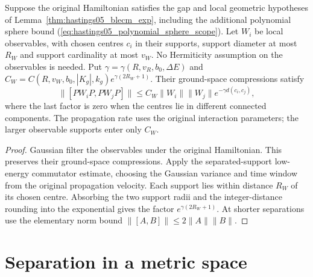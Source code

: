 \begin{lemma}
    \label{thm:hastings05_observable_commutator_decay}
    \leanok
    Suppose the original Hamiltonian satisfies the gap and local geometric
    hypotheses of Lemma~\ref{thm:hastings05_blecm_exp}, including the
    additional polynomial sphere bound
    (\ref{eq:hastings05_polynomial_sphere_scope}). Let $W_i$ be local
    observables, with chosen centres $c_i$ in their supports, support diameter
    at most $R_W$ and support cardinality at most $v_W$. No Hermiticity
    assumption on the observables is needed. Put
    $\gamma=\gamma(R,v_R,b_0,\Delta E)$ and
    $C_W=C(R,v_W,b_0,|K_g|,k_g)e^{\gamma(2R_W+1)}$.
    Their ground-space compressions satisfy
    \[
        \|[PW_iP,PW_jP]\|
        \le C_W\|W_i\|\|W_j\|e^{-\gamma d(c_i,c_j)},
    \]
    where the last factor is zero when the centres lie in different
    connected components. The propagation rate uses the original interaction
    parameters; the larger observable supports enter only $C_W$.
\end{lemma}
\begin{proof}\leanok
    Gaussian filter the observables under the original Hamiltonian. This
    preserves their ground-space compressions. Apply the separated-support
    low-energy commutator estimate, choosing the Gaussian variance and time
    window from the original propagation velocity. Each support lies within
    distance $R_W$ of its chosen centre. Absorbing the two support radii and
    the integer-distance rounding into the exponential gives the factor
    $e^{\gamma(2R_W+1)}$. At shorter separations use the elementary norm
    bound $\|[A,B]\|\le2\|A\|\|B\|$.
\end{proof}

\section{Separation in a metric space}
\label{sec:low_energy_metric}


